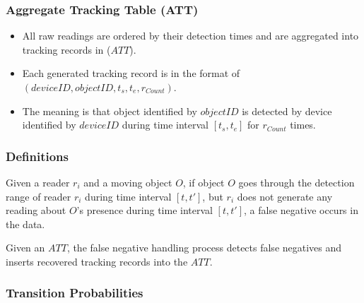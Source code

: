 \begin{frame}
\frametitle{Aggregate Tracking Table (ATT)~\cite{baba2013spatiotemporal}}

\begin{itemize}

  \item All raw readings are ordered by their detection times and are aggregated into tracking records in ($ATT$).

  \item Each generated tracking record is in the format of $(deviceID, objectID, t_s, t_e, r_{Count})$.

  \item The meaning is that object identified by $objectID$ is detected by device identified by $deviceID$ during time interval $[t_s, t_e]$ for $r_{Count}$ times.
\end{itemize}

\end{frame}


\begin{frame}
\frametitle{Definitions}

\begin{definition}
  Given a reader $r_i$ and a moving object $O$, if object $O$ goes through the detection range of reader $r_i$ during time interval $[t, t']$, but $r_i$ does not generate any reading about $O$'s presence during time interval $[t, t']$, a false negative occurs in the data.
\end{definition}

\begin{definition}
  Given an $ATT$, the false negative handling process detects false negatives and inserts recovered tracking records into the $ATT$.
\end{definition}

\end{frame}


\begin{frame}
\frametitle{Transition Probabilities} %



\end{frame}
